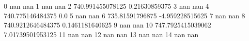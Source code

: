 0 nan nan
1 nan nan
2 740.991455078125 0.21630859375
3 nan nan
4 740.775146484375 0.0
5 nan nan
6 735.81591796875 -4.959228515625
7 nan nan
8 740.9212646484375 0.1461181640625
9 nan nan
10 747.7925415039062 7.01739501953125
11 nan nan
12 nan nan
13 nan nan
14 nan nan
